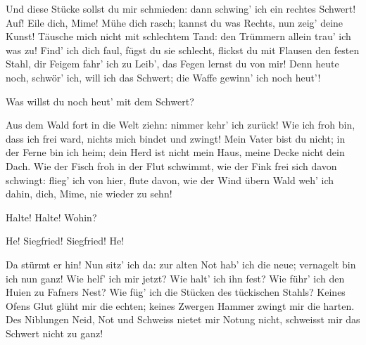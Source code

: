 \begin{drama}
\Siegfriedspeaks


Und diese Stücke
sollst du mir schmieden:
dann schwing' ich ein rechtes Schwert!
Auf! Eile dich, Mime!
Mühe dich rasch;
kannst du was Rechts,
nun zeig' deine Kunst!
Täusche mich nicht
mit schlechtem Tand:
den Trümmern allein
trau' ich was zu!
Find' ich dich faul,
fügst du sie schlecht,
flickst du mit Flausen
den festen Stahl,
dir Feigem fahr' ich zu Leib',
das Fegen lernst du von mir!
Denn heute noch, schwör' ich,
will ich das Schwert;
die Waffe gewinn' ich noch heut'!

\Mimespeaks


Was willst du noch heut' mit dem Schwert?

\Siegfriedspeaks

Aus dem Wald fort
in die Welt ziehn:
nimmer kehr' ich zurück!
Wie ich froh bin,
dass ich frei ward,
nichts mich bindet und zwingt!
Mein Vater bist du nicht;
in der Ferne bin ich heim;
dein Herd ist nicht mein Haus,
meine Decke nicht dein Dach.
Wie der Fisch froh
in der Flut schwimmt,
wie der Fink frei
sich davon schwingt:
flieg' ich von hier,
flute davon,
wie der Wind übern Wald
weh' ich dahin,
dich, Mime, nie wieder zu sehn!


\Mimespeaks


Halte! Halte! Wohin?



He! Siegfried!
Siegfried! He!


Da stürmt er hin!
Nun sitz' ich da:
zur alten Not
hab' ich die neue;
vernagelt bin ich nun ganz!
Wie helf' ich mir jetzt?
Wie halt' ich ihn fest?
Wie führ' ich den Huien
zu Fafners Nest?
Wie füg' ich die Stücken
des tückischen Stahls?
Keines Ofens Glut
glüht mir die echten;
keines Zwergen Hammer
zwingt mir die harten.
Des Niblungen Neid,
Not und Schweiss
nietet mir Notung nicht,
schweisst mir das Schwert nicht zu ganz!


\scene



\end{drama}
